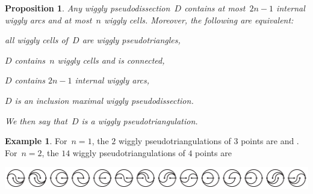 \documentclass[submission]{FPSAC2025}
\newtheorem{proposition}[theorem]{Proposition}
\theoremstyle{definition}
\newtheorem{example}[theorem]{Example}
\newcommand{\darkblue}{\color{darkblue}} %
\newcommand{\defn}[1]{\textsl{\darkblue #1}} %
\begin{document}
\begin{proposition}
\label{prop:wigglyPseudotriangulations}
Any wiggly pseudodissection~$D$ contains at most~$2n-1$ internal wiggly arcs and at most~$n$ wiggly cells.
Moreover, the following are equivalent:
\begin{compactenum}[(i)]
\item all wiggly cells of~$D$ are wiggly pseudotriangles,
\item $D$ contains~$n$ wiggly cells and is connected,
\item $D$ contains $2n-1$ internal wiggly arcs,
\item $D$ is an inclusion maximal wiggly pseudodissection.
\end{compactenum}
We then say that~$D$ is a \defn{wiggly pseudotriangulation}.
\end{proposition}

\begin{example}
\label{exm:allSmallWigglyPseudotriangulations}
For~$n = 1$, the $2$ wiggly pseudotriangulations of $3$ points are  and .
For~${n = 2}$, the $14$ wiggly pseudotriangulations of $4$ points are \\[.2cm]
\centerline{\includegraphics[scale=.85]{wigglyPseudotriangulations}}
\end{example}
\end{document}
